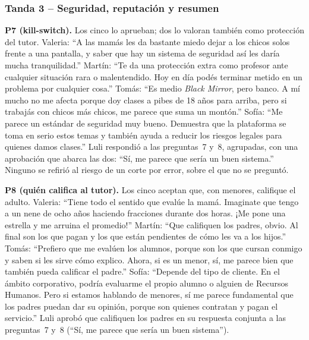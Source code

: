 \subsubsection*{Tanda 3 -- Seguridad, reputación y resumen}

\textbf{P7 (kill-switch).} Los cinco lo aprueban; dos lo valoran
también como protección del tutor. Valeria: ``A las mamás les da
bastante miedo dejar a los chicos solos frente a una pantalla, y saber
que hay un sistema de seguridad así les daría mucha tranquilidad.''
Martín: ``Te da una protección extra como profesor ante cualquier
situación rara o malentendido. Hoy en día podés terminar metido en un
problema por cualquier cosa.'' Tomás: ``Es medio \emph{Black Mirror},
pero banco. A mí mucho no me afecta porque doy clases a pibes de 18 años
para arriba, pero si trabajás con chicos más chicos, me parece que suma
un montón.'' Sofía: ``Me parece un estándar de seguridad muy bueno.
Demuestra que la plataforma se toma en serio estos temas y también
ayuda a reducir los riesgos legales para quienes damos clases.'' Luli
respondió a las preguntas~7 y~8, agrupadas, con una aprobación que
abarca las dos: ``Sí, me parece que sería un buen sistema.'' Ninguno se refirió al riesgo de un corte por error, sobre el que no se preguntó.

\textbf{P8 (quién califica al tutor).} Los cinco aceptan que, con
menores, califique el adulto. Valeria: ``Tiene todo el sentido
que evalúe la mamá. Imaginate que tengo a un nene de ocho años haciendo
fracciones durante dos horas. ¡Me pone una estrella y me arruina el
promedio!'' Martín: ``Que califiquen los padres, obvio. Al final son los
que pagan y los que están pendientes de cómo les va a los hijos.''
Tomás: ``Prefiero que me evalúen los alumnos, porque son los que cursan
conmigo y saben si les sirve cómo explico. Ahora, si es un menor, sí, me
parece bien que también pueda calificar el padre.'' Sofía: ``Depende del
tipo de cliente. En el ámbito corporativo, podría evaluarme el propio
alumno o alguien de Recursos Humanos. Pero si estamos hablando de
menores, sí me parece fundamental que los padres puedan dar su opinión,
porque son quienes contratan y pagan el servicio.'' Luli aprobó que
califiquen los padres en su respuesta conjunta a las preguntas~7 y~8
(``Sí, me parece que sería un buen sistema'').

